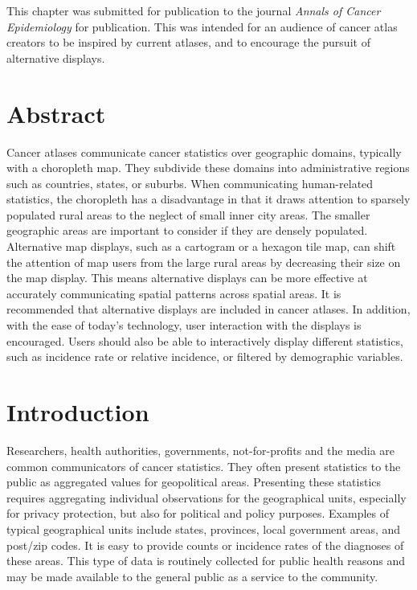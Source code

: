 \documentclass{monashthesis}
\begin{document}
This chapter was submitted for publication to the journal \emph{Annals of Cancer Epidemiology} for publication. This was intended for an audience of cancer atlas creators to be inspired by current atlases, and to encourage the pursuit of alternative displays.

\newpage

\hypertarget{abstract2}{%
\section*{Abstract}\label{abstract2}}

Cancer atlases communicate cancer statistics over geographic domains, typically with a choropleth map. They subdivide these domains into administrative regions such as countries, states, or suburbs. When communicating human-related statistics, the choropleth has a disadvantage in that it draws attention to sparsely populated rural areas to the neglect of small inner city areas. The smaller geographic areas are important to consider if they are densely populated. Alternative map displays, such as a cartogram or a hexagon tile map, can shift the attention of map users from the large rural areas by decreasing their size on the map display. This means alternative displays can be more effective at accurately communicating spatial patterns across spatial areas. It is recommended that alternative displays are included in cancer atlases. In addition, with the ease of today's technology, user interaction with the displays is encouraged. Users should also be able to interactively display different statistics, such as incidence rate or relative incidence, or filtered by demographic variables.

\hypertarget{intro2}{%
\section{Introduction}\label{intro2}}

Researchers, health authorities, governments, not-for-profits and the media are common communicators of cancer statistics. They often present statistics to the public as aggregated values for geopolitical areas. Presenting these statistics requires aggregating individual observations for the geographical units, especially for privacy protection, but also for political and policy purposes. Examples of typical geographical units include states, provinces, local government areas, and post/zip codes. It is easy to provide counts or incidence rates of the diagnoses of these areas. This type of data is routinely collected for public health reasons and may be made available to the general public as a service to the community.
\end{document}
